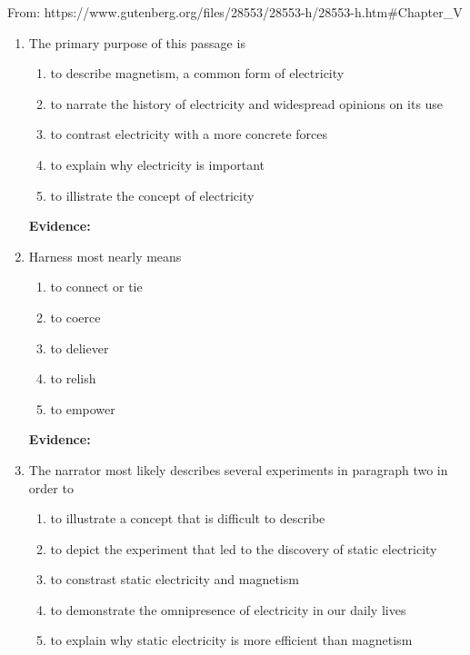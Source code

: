 From: https://www.gutenberg.org/files/28553/28553-h/28553-h.htm#Chapter_V

\begin{enumerate}

\item The primary purpose of this passage is 

\bigskip
\begin{enumerate}[label=(\Alph*)]
\item to describe magnetism, a common form of electricity
\item to narrate the history of electricity and widespread opinions on its use
\item to contrast electricity with a more concrete forces
\item to explain why electricity is important
\item to illistrate the concept of electricity
\end{enumerate}

\bigskip
\textbf{Evidence:} \hrulefill

\item Harness most nearly means

\bigskip
\begin{enumerate}[label=(\Alph*)]
\item to connect or tie
\item to coerce
\item to deliever
\item to relish
\item to empower
\end{enumerate}

\bigskip
\textbf{Evidence:} \hrulefill

\item The narrator most likely describes several experiments in paragraph two in order to

\bigskip
\begin{enumerate}[label=(\Alph*)]
\item to illustrate a concept that is difficult to describe
\item to depict the experiment that led to the discovery of static electricity
\item to constrast static electricity and magnetism 
\item to demonstrate the omnipresence of electricity in our daily lives
\item to explain why static electricity is more efficient than magnetism 
\end{enumerate}


\end{enumerate}
